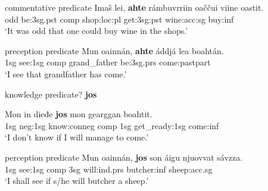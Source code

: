 \documentclass[a4,12pt]{scrartcl}
\begin{document}
\begin{exe}
	\ex  commentative predicate \label{ahteSubject} \cite[194]{nickel1994} 
	\gll 	Imaš 	lei, 	{\bf ahte} 	rámbuvrriin 	oaččui 	viine 	oastit.\\
	odd 	be:{\sc 3sg.pst} {\sc comp} shop:{\sc loc:pl} get:{\sc 3sg:pst} wine:{\sc acc:sg} buy:{\sc inf}\\
	\glt 	‘It was odd that one could buy wine in the shops.’
	
	\ex preception predicate \label{ahteObject} \cite[194]{nickel1994}
	\gll 	Mun 	oainnán, 	{\bf ahte} 	áddjá 	lea 	boahtán.\\
	{\sc 1sg} see:{\sc 1sg} {\sc comp} grand\_father be:{\sc 3sg.prs} come:{\sc pastpart}\\%
	\glt 	‘I see that grandfather has come.’
	
		 \ex knowledge predicate? \textbf{jos} \label{josObjekt}
	 	\begin{xlist}
		\ex 	
		\gll Mon in dieđe {\bf jos} mon gearggan boahtit.\\
		{\sc 1sg} {\sc neg:1sg} know:{\sc conneg} {\sc comp} {\sc 1sg} get\_ready:{\sc 1sg} come:{\sc inf}\\
		\glt ‘I don't know if I will manage to come.’ %
		
		\ex perception predicate
		\gll 	Mun 	oainnán, 	{\bf jos}  son áigu njuovvat sávzza.\\
		{\sc 1sg} see:{\sc 1sg} {\sc comp} {\sc 3sg} will:{\sc ind.prs} butcher:{\sc inf} sheep:{\sc acc.sg}\\
		\glt 	‘I shall see if s/he will butcher a sheep.’
		\end{xlist}	

%
%
%
	

\end{exe}
\end{document}
